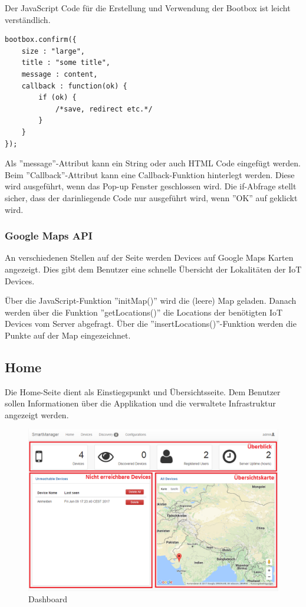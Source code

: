 Der JavaScript Code für die Erstellung und Verwendung der Bootbox ist leicht verständlich.

\begin{lstlisting}
bootbox.confirm({
	size : "large",
	title : "some title",
	message : content,
	callback : function(ok) {
		if (ok) {
			/*save, redirect etc.*/		
		}
	}
});
\end{lstlisting} 

Als ''message''-Attribut kann ein String oder auch HTML Code eingefügt werden.  Beim ''Callback''-Attribut kann eine Callback-Funktion hinterlegt werden. Diese wird ausgeführt, wenn das Pop-up Fenster geschlossen wird. Die if-Abfrage stellt sicher, dass der darinliegende Code nur ausgeführt wird, wenn ''OK'' auf geklickt wird.

\subsubsection{Google Maps API}
An verschiedenen Stellen auf der Seite werden Devices auf Google Maps Karten angezeigt. Dies gibt dem Benutzer eine schnelle Übersicht der Lokalitäten der IoT Devices.

Über die JavaScript-Funktion ''initMap()'' wird die (leere) Map geladen. Danach werden über die Funktion ''getLocations()'' die Locations der benötigten IoT Devices vom Server abgefragt. Über die ''insertLocations()''-Funktion werden die Punkte auf der Map eingezeichnet.

\subsection{Home}
Die Home-Seite dient als Einstiegspunkt und Übersichtsseite. Dem Benutzer sollen Informationen über die Applikation und die verwaltete Infrastruktur angezeigt werden.

\begin{figure}[H]
\centering
\includegraphics[scale=0.57]{../04_Realisierung/images/userinterface/home.png}
\caption{Dashboard}
\end{figure}

